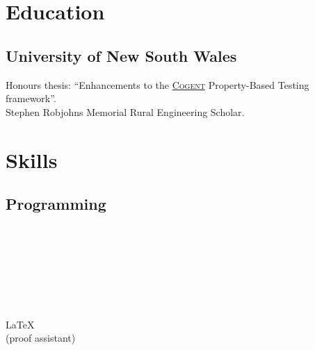 \documentclass[a4paper]{resume}
\begin{document}
\lastupdated{}

\begin{minipage}[t]{0.33\textwidth} %
	\section{Education}
	\smallsectionspace{}

	\subsection{University of New South Wales}
	Honours thesis: ``Enhancements to the \href{https://github.com/NICTA/cogent}{\textsc{Cogent}} Property-Based
	Testing framework''. \\ Stephen Robjohns Memorial Rural Engineering Scholar.

	\section{Skills}
	\smallsectionspace{}

	\subsection{Programming}
	\smallsectionspace{}

	\rust{} \textbullet{} \clang{} \textbullet{} \cpp{} \\
	\python{} \textbullet{} \bash{} \\
	\typescript{} \textbullet{} \javascript{} \\
	\smallsectionspace{}

	\java{} \textbullet{} \kotlin{} \\
	\haskell{} \\
	\vhdl{} \textbullet{} \verilog{} \\
	\LaTeX{} \textbullet{} \matlab{} \\
	\isabelle{} (proof assistant) \\
	\sectionspace{}


\end{minipage}
\end{document}
